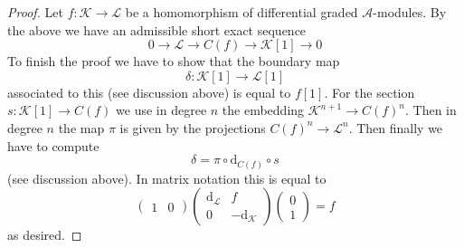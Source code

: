 \documentclass[10pt,a4paper]{amsart}
\theoremstyle{plain}
\theoremstyle{definition}
\theoremstyle{remark}
\numberwithin{equation}{subsection}
\begin{document}
\begin{proof}
Let $f : \mathcal{K} \to \mathcal{L}$
be a homomorphism of differential graded $\mathcal{A}$-modules.
By the above we have an admissible short exact sequence
$$
0 \to \mathcal{L} \to C(f) \to \mathcal{K}[1] \to 0
$$
To finish the proof we have to show that the boundary map
$$
\delta : \mathcal{K}[1] \to \mathcal{L}[1]
$$
associated to this (see discussion above) is equal to $f[1]$.
For the section $s : \mathcal{K}[1] \to C(f)$ we use in degree
$n$ the embedding $\mathcal{K}^{n + 1} \to C(f)^n$. Then
in degree $n$ the map $\pi$ is given by the projections
$C(f)^n \to \mathcal{L}^n$. Then finally we have to compute
$$
\delta = \pi \circ \text{d}_{C(f)} \circ s
$$
(see discussion above). In matrix notation this is equal to
$$
\left(
\begin{matrix}
1 & 0
\end{matrix}
\right)
\left(
\begin{matrix}
\text{d}_\mathcal{L} & f \\
0 & -\text{d}_\mathcal{K}
\end{matrix}
\right)
\left(
\begin{matrix}
0 \\
1
\end{matrix}
\right) = f
$$
as desired.
\end{proof}
\end{document}
